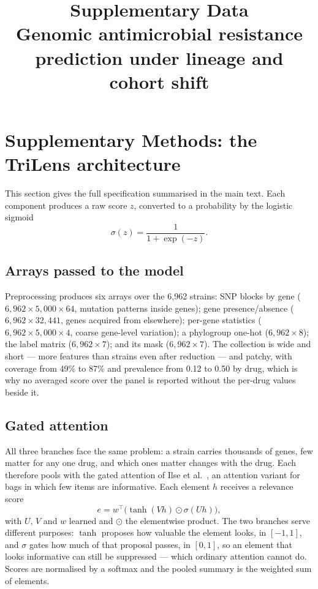 \documentclass[11pt]{article}
\title{Supplementary Data\\[2pt]
\large Genomic antimicrobial resistance prediction under lineage and cohort shift}
\author{}
\date{}
\begin{document}
\maketitle

\section{Supplementary Methods: the TriLens architecture}

This section gives the full specification summarised in the main text. Each component produces a
raw score $z$, converted to a probability by the logistic sigmoid
\begin{equation}
\sigma(z) = \frac{1}{1 + \exp(-z)}.
\label{eq:sigmoid}
\end{equation}

\subsection{Arrays passed to the model}
Preprocessing produces six arrays over the 6,962 strains: SNP blocks by gene
($6{,}962 \times 5{,}000 \times 64$, mutation patterns inside genes); gene presence/absence
($6{,}962 \times 32{,}441$, genes acquired from elsewhere); per-gene statistics
($6{,}962 \times 5{,}000 \times 4$, coarse gene-level variation); a phylogroup one-hot
($6{,}962 \times 8$); the label matrix ($6{,}962 \times 7$); and its mask
($6{,}962 \times 7$). The collection is wide and short --- more features than strains even after
reduction --- and patchy, with coverage from 49\% to 87\% and prevalence from 0.12 to 0.50 by drug,
which is why no averaged score over the panel is reported without the per-drug values beside it.

\subsection{Gated attention}
All three branches face the same problem: a strain carries thousands of genes, few matter for any
one drug, and which ones matter changes with the drug. Each therefore pools with the gated attention
of Ilse et al.\ \cite{ilse2018attention}, an attention variant \cite{vaswani2017attention} for bags
in which few items are informative. Each element $h$ receives a relevance score
\begin{equation}
e = w^\top \big(\tanh(V h) \odot \sigma(U h)\big),
\label{eq:gated_attn}
\end{equation}
with $U$, $V$ and $w$ learned and $\odot$ the elementwise product. The two branches serve different
purposes: $\tanh$ proposes how valuable the element looks, in $[-1, 1]$, and $\sigma$ gates how much
of that proposal passes, in $[0, 1]$, so an element that looks informative can still be suppressed
--- which ordinary attention cannot do. Scores are normalised by a softmax and the pooled summary is
the weighted sum of elements.
\end{document}

